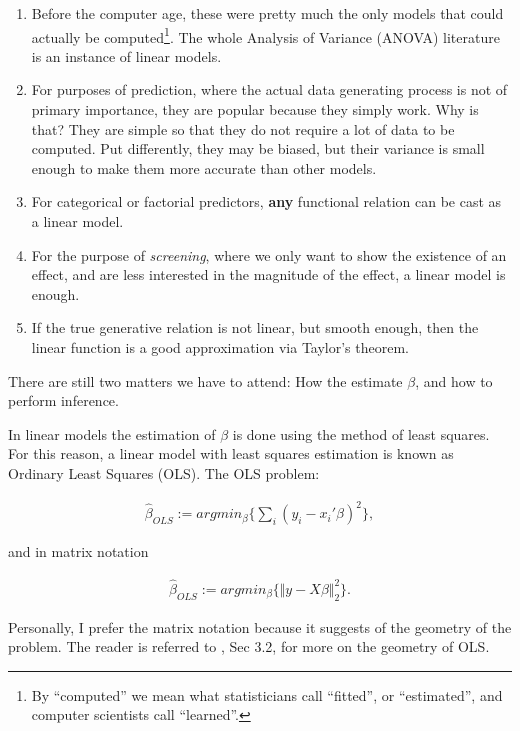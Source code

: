 \documentclass[]{book}
\theoremstyle{definition}
\theoremstyle{definition}
\theoremstyle{remark}
\let\BeginKnitrBlock\begin \let\EndKnitrBlock\end
\begin{document}
\begin{enumerate}
\def\labelenumi{\arabic{enumi}.}
\item
  Before the computer age, these were pretty much the only models that
  could actually be computed\footnote{By ``computed'' we mean what
    statisticians call ``fitted'', or ``estimated'', and computer
    scientists call ``learned''.}. The whole Analysis of Variance
  (ANOVA) literature is an instance of linear models.
\item
  For purposes of prediction, where the actual data generating process
  is not of primary importance, they are popular because they simply
  work. Why is that? They are simple so that they do not require a lot
  of data to be computed. Put differently, they may be biased, but their
  variance is small enough to make them more accurate than other models.
\item
  For categorical or factorial predictors, \textbf{any} functional
  relation can be cast as a linear model.
\item
  For the purpose of \emph{screening}, where we only want to show the
  existence of an effect, and are less interested in the magnitude of
  the effect, a linear model is enough.
\item
  If the true generative relation is not linear, but smooth enough, then
  the linear function is a good approximation via Taylor's theorem.
\end{enumerate}

There are still two matters we have to attend: How the estimate
\(\beta\), and how to perform inference.

In linear models the estimation of \(\beta\) is done using the method of
least squares. For this reason, a linear model with least squares
estimation is known as Ordinary Least Squares (OLS). The OLS problem:

\begin{align}
  \hat \beta_{OLS}:= argmin_\beta \{ \sum_i (y_i-x_i'\beta)^2 \},
  \label{eq:ols}
\end{align}

and in matrix notation

\begin{align}
  \hat \beta_{OLS}:= argmin_\beta \{ \Vert y-X\beta \Vert^2_2 \}.
  \label{eq:ols-matrix}
\end{align}

\BeginKnitrBlock{remark}
Personally, I prefer the matrix notation because
it suggests of the geometry of the problem. The reader is referred to
\citet{friedman2001elements}, Sec 3.2, for more on the geometry of OLS.
\EndKnitrBlock{remark}
\end{document}
